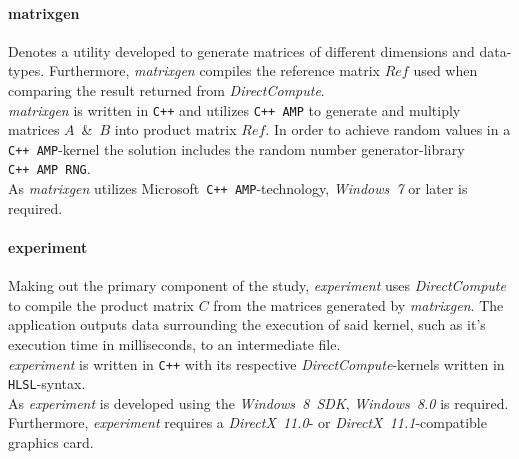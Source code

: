 \documentclass[fleqn,10pt]{SelfArx} %
\begin{document}
\paragraph{matrixgen}
Denotes a utility developed to generate matrices of different dimensions and data-types. Furthermore, \textit{matrixgen} compiles the reference matrix $Ref$ used when comparing the result returned from \textit{DirectCompute}. \\
\textit{matrixgen} is written in \texttt{C++} and utilizes \texttt{C++~AMP} to generate and multiply matrices $A$~\&~$B$ into product matrix $Ref$. In order to achieve random values in a \texttt{C++~AMP}-kernel the solution includes the random number generator-library \texttt{C++~AMP~RNG}.\\
As \textit{matrixgen} utilizes Microsoft~\texttt{C++~AMP}-technology, \textit{Windows~7} or later is required.

\paragraph{experiment}
Making out the primary component of the study, \textit{experiment} uses \textit{DirectCompute} to compile the product matrix $C$ from the matrices generated by \textit{matrixgen}. The application outputs data surrounding the execution of said kernel, such as it's execution time in milliseconds, to an intermediate file.\\
\textit{experiment} is written in \texttt{C++} with its respective \textit{DirectCompute}-kernels written in \texttt{HLSL}-syntax.\\
As \textit{experiment} is developed using the \textit{Windows~8~SDK}, \textit{Windows~8.0} is required. Furthermore, \textit{experiment} requires a \textit{DirectX~11.0}- or \textit{DirectX~11.1}-compatible graphics card.
\end{document}
